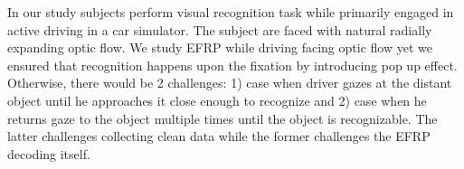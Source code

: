 \documentclass[12pt]{iopart}
\begin{document}
In our study subjects perform visual recognition task while primarily engaged
in active driving in a car simulator.
The subject are faced with natural radially expanding optic flow.
We study EFRP
while driving
facing optic flow
yet we ensured that recognition happens upon the fixation by introducing pop up effect.
Otherwise, there would be 2 challenges: 
1) case when driver gazes at the distant object
until he approaches it close enough to recognize and
2) case when he returns gaze to the object multiple times until the object
is recognizable.
The latter challenges collecting clean data while the former challenges
the EFRP decoding itself.





\end{document}
